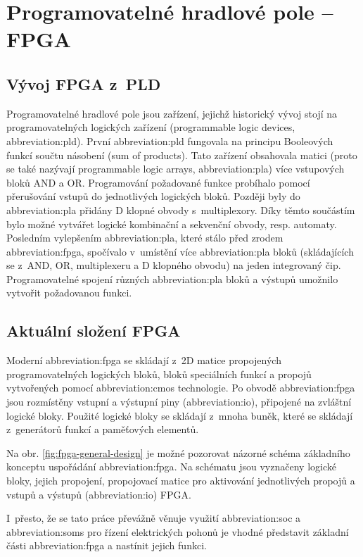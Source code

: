 \documentclass[a4paper, twoside, 11pt]{article}
\begin{document}
	\section{Programovatelné hradlové pole – FPGA}
		\subsection{Vývoj FPGA z~PLD}
		Programovatelné hradlové pole jsou zařízení, jejichž historický vývoj stojí na programovatelných logických zařízení (programmable logic devices, \gls{abbreviation:pld}). První \gls{abbreviation:pld} fungovala na principu Booleových funkcí součtu násobení (sum of products). Tato zařízení obsahovala matici (proto se také nazývají programmable logic arrays, \gls{abbreviation:pla}) více vstupových bloků AND a OR. Programování požadované funkce probíhalo pomocí přerušování vstupů do jednotlivých logických bloků. Později byly do \gls{abbreviation:pla} přidány D klopné obvody s~multiplexory. Díky těmto součástím bylo možné vytvářet logické kombinační a sekvenční obvody, resp. automaty. Posledním vylepšením \gls{abbreviation:pla}, které stálo před zrodem \gls{abbreviation:fpga}, spočívalo v~umístění více \gls{abbreviation:pla} bloků (skládajících se z~AND, OR, multiplexeru a D klopného obvodu) na jeden integrovaný čip. Programovatelné spojení různých \gls{abbreviation:pla} bloků a výstupů umožnilo vytvořit požadovanou funkci. \cite{Sass2010}\par

		\subsection{Aktuální složení FPGA}
		Moderní \gls{abbreviation:fpga} se skládají z~2D matice propojených programovatelných logických bloků, bloků speciálních funkcí a propojů vytvořených pomocí \gls{abbreviation:cmos} technologie. Po obvodě \gls{abbreviation:fpga} jsou rozmístěny vstupní a výstupní piny (\gls{abbreviation:io}), připojené na zvláštní logické bloky. Použité logické bloky se skládají z~mnoha buněk, které se skládají z~generátorů funkcí a paměťových elementů. \cite{Sass2010}\par
		Na obr. \ref{fig:fpga-general-design} je možné pozorovat názorné schéma základního konceptu uspořádání \gls{abbreviation:fpga}. Na schématu jsou vyznačeny logické bloky, jejich propojení, propojovací matice pro aktivování jednotlivých propojů a vstupů a výstupů (\gls{abbreviation:io}) FPGA.\par
		I~přesto, že se tato práce převážně věnuje využití \gls{abbreviation:soc} a \gls{abbreviation:soms} pro řízení elektrických pohonů je vhodné představit základní části \gls{abbreviation:fpga} a nastínit jejich funkci.
\end{document}
